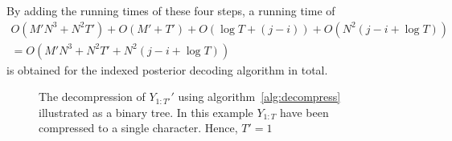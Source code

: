 By adding the running times of these four steps, a running time of
\begin{gather*}
  O\left(M' N^3 + N^2 T'\right) + O\left(M' + T'\right) + O\left(\log T + (j - i)\right) + O\left(N^2 (j - i + \log T)\right) \\
  = O\left(M' N^3 + N^2 T' + N^2 (j - i + \log T)\right)
\end{gather*}
is obtained for the indexed posterior decoding algorithm in total.

\begin{figure}
  \centering
  
  \caption{The decompression of $Y_{1:T'}'$ using
    algorithm~\ref{alg:decompress} illustrated as a binary tree. In this
    example $Y_{1:T}$ have been compressed to a single character. Hence,
    $T' = 1$}
  \label{fig:decompression}
\end{figure}


